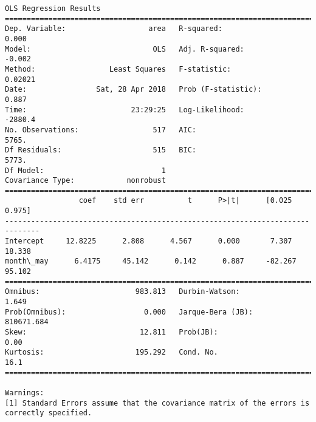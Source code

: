 \documentclass[11pt]{article}
\begin{document}
\begin{Verbatim}[commandchars=\\\{\}]
                            OLS Regression Results                            
==============================================================================
Dep. Variable:                   area   R-squared:                       0.000
Model:                            OLS   Adj. R-squared:                 -0.002
Method:                 Least Squares   F-statistic:                   0.02021
Date:                Sat, 28 Apr 2018   Prob (F-statistic):              0.887
Time:                        23:29:25   Log-Likelihood:                -2880.4
No. Observations:                 517   AIC:                             5765.
Df Residuals:                     515   BIC:                             5773.
Df Model:                           1                                         
Covariance Type:            nonrobust                                         
==============================================================================
                 coef    std err          t      P>|t|      [0.025      0.975]
------------------------------------------------------------------------------
Intercept     12.8225      2.808      4.567      0.000       7.307      18.338
month\_may      6.4175     45.142      0.142      0.887     -82.267      95.102
==============================================================================
Omnibus:                      983.813   Durbin-Watson:                   1.649
Prob(Omnibus):                  0.000   Jarque-Bera (JB):           810671.684
Skew:                          12.811   Prob(JB):                         0.00
Kurtosis:                     195.292   Cond. No.                         16.1
==============================================================================

Warnings:
[1] Standard Errors assume that the covariance matrix of the errors is correctly specified.



\end{Verbatim}
\end{document}
